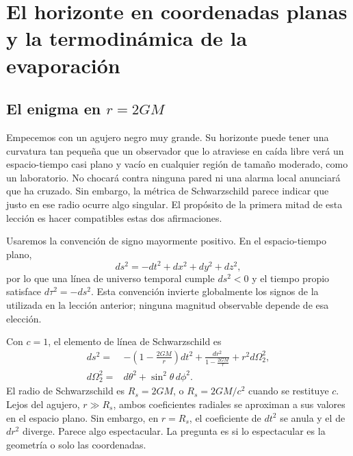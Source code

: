 \chapter{El horizonte en coordenadas planas y la termodinámica de la evaporación}


\section{El enigma en \texorpdfstring{\(r=2GM\)}{r=2GM}}

Empecemos con un agujero negro muy grande. Su horizonte puede tener una curvatura tan pequeña que un observador que lo atraviese en caída libre verá un espacio-tiempo casi plano y vacío en cualquier región de tamaño moderado, como un laboratorio. No chocará contra ninguna pared ni una alarma local anunciará que ha cruzado. Sin embargo, la métrica de Schwarzschild parece indicar que justo en ese radio ocurre algo singular. El propósito de la primera mitad de esta lección es hacer compatibles estas dos afirmaciones.

Usaremos la convención de signo mayormente positivo. En el espacio-tiempo plano,
\begin{equation}
ds^2=-dt^2+dx^2+dy^2+dz^2,
\end{equation}
por lo que una línea de universo temporal cumple \(ds^2<0\) y el tiempo propio satisface \(d\tau^2=-ds^2\). Esta convención invierte globalmente los signos de la utilizada en la lección anterior; ninguna magnitud observable depende de esa elección.

Con \(c=1\), el elemento de línea de Schwarzschild es
\begin{equation}
\begin{aligned}
ds^2={}&-\left(1-\frac{2GM}{r}\right)dt^2
+\frac{dr^2}{1-\frac{2GM}{r}}
+r^2d\Omega_2^2,\\
d\Omega_2^2={}&d\theta^2+\sin^2\theta\,d\phi^2 .
\end{aligned}
\label{eq:l03-schwarzschild}
\end{equation}
El radio de Schwarzschild es \(R_s=2GM\), o \(R_s=2GM/c^2\) cuando se restituye \(c\). Lejos del agujero, \(r\gg R_s\), ambos coeficientes radiales se aproximan a sus valores en el espacio plano. Sin embargo, en \(r=R_s\), el coeficiente de \(dt^2\) se anula y el de \(dr^2\) diverge. Parece algo espectacular. La pregunta es si lo espectacular es la geometría o solo las coordenadas.

